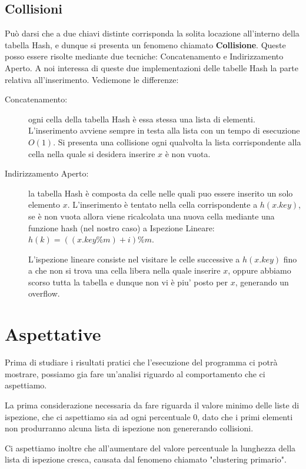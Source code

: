 \documentclass{article}
\begin{document}
\subsection{Collisioni}
Può darsi che a due chiavi distinte corrisponda la solita locazione all'interno della tabella Hash, e dunque si presenta un fenomeno chiamato \textbf{Collisione}. Queste posso essere risolte mediante due tecniche: Concatenamento e Indirizzamento Aperto.
A noi interessa di queste due implementazioni delle tabelle Hash la parte relativa all'inserimento. Vediemone le differenze:

\begin{description}
        \item[Concatenamento: ] ogni cella della tabella Hash è essa stessa una lista di elementi. L'inserimento avviene sempre in testa alla lista con un tempo di esecuzione $O(1)$. Si presenta una collisione ogni qualvolta la lista corrispondente alla cella nella quale si desidera inserire $x$ è non vuota.
            
        
        \item[Indirizzamento Aperto: ] la tabella Hash è composta da celle nelle quali puo essere inserito un solo elemento $x$. L'inserimento è tentato nella cella corrispondente a $h(x.key)$, se è non vuota allora viene ricalcolata una nuova cella mediante una funzione hash (nel nostro caso) a Ispezione Lineare: $h(k)=((x.key\%m)+i)\%m$.
        
        L'ispezione lineare consiste nel visitare le celle successive a $h(x.key)$ fino a che non si trova una cella libera nella quale inserire $x$, oppure abbiamo scorso tutta la tabella e dunque non vi è piu' posto per $x$, generando un overflow.
\end{description}
\newpage
\section{Aspettative}
Prima di studiare i risultati pratici che l'esecuzione del programma ci potrà mostrare, possiamo gia fare un'analisi riguardo al comportamento che ci aspettiamo.

La prima considerazione necessaria da fare riguarda il valore minimo delle liste di ispezione, che ci aspettiamo sia ad ogni percentuale $0$, dato che i primi elementi non produrranno alcuna lista di ispezione non genererando collisioni. 

Ci aspettiamo inoltre che all'aumentare del valore percentuale la lunghezza della lista di ispezione cresca, causata dal fenomeno chiamato "clustering primario". 
\end{document}
